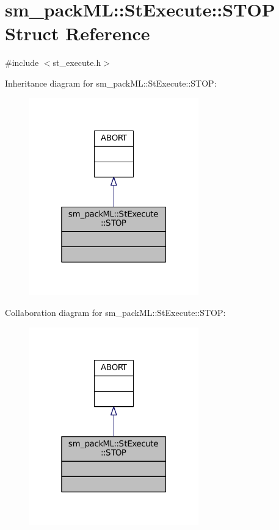 \hypertarget{structsm__packML_1_1StExecute_1_1STOP}{}\section{sm\+\_\+pack\+ML\+:\+:St\+Execute\+:\+:S\+T\+OP Struct Reference}
\label{structsm__packML_1_1StExecute_1_1STOP}


{\ttfamily \#include $<$st\+\_\+execute.\+h$>$}



Inheritance diagram for sm\+\_\+pack\+ML\+:\+:St\+Execute\+:\+:S\+T\+OP\+:
\nopagebreak
\begin{figure}[H]
\begin{center}
\leavevmode
\includegraphics[width=208pt]{structsm__packML_1_1StExecute_1_1STOP__inherit__graph}
\end{center}
\end{figure}


Collaboration diagram for sm\+\_\+pack\+ML\+:\+:St\+Execute\+:\+:S\+T\+OP\+:
\nopagebreak
\begin{figure}[H]
\begin{center}
\leavevmode
\includegraphics[width=208pt]{structsm__packML_1_1StExecute_1_1STOP__coll__graph}
\end{center}
\end{figure}


